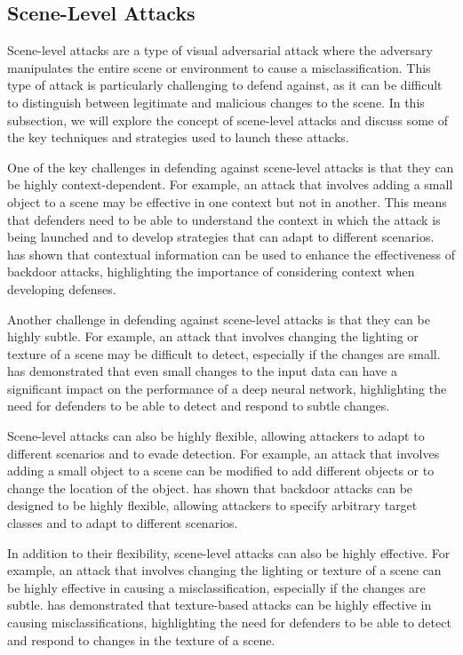 \documentclass[11pt]{article}
\begin{document}
\subsection{Scene-Level Attacks}

Scene-level attacks are a type of visual adversarial attack where the adversary manipulates the entire scene or environment to cause a misclassification. This type of attack is particularly challenging to defend against, as it can be difficult to distinguish between legitimate and malicious changes to the scene. In this subsection, we will explore the concept of scene-level attacks and discuss some of the key techniques and strategies used to launch these attacks.

One of the key challenges in defending against scene-level attacks is that they can be highly context-dependent. For example, an attack that involves adding a small object to a scene may be effective in one context but not in another. This means that defenders need to be able to understand the context in which the attack is being launched and to develop strategies that can adapt to different scenarios. \cite{ref70} has shown that contextual information can be used to enhance the effectiveness of backdoor attacks, highlighting the importance of considering context when developing defenses.

Another challenge in defending against scene-level attacks is that they can be highly subtle. For example, an attack that involves changing the lighting or texture of a scene may be difficult to detect, especially if the changes are small. \cite{ref78} has demonstrated that even small changes to the input data can have a significant impact on the performance of a deep neural network, highlighting the need for defenders to be able to detect and respond to subtle changes.

Scene-level attacks can also be highly flexible, allowing attackers to adapt to different scenarios and to evade detection. For example, an attack that involves adding a small object to a scene can be modified to add different objects or to change the location of the object. \cite{ref79} has shown that backdoor attacks can be designed to be highly flexible, allowing attackers to specify arbitrary target classes and to adapt to different scenarios.

In addition to their flexibility, scene-level attacks can also be highly effective. For example, an attack that involves changing the lighting or texture of a scene can be highly effective in causing a misclassification, especially if the changes are subtle. \cite{ref80} has demonstrated that texture-based attacks can be highly effective in causing misclassifications, highlighting the need for defenders to be able to detect and respond to changes in the texture of a scene.
\end{document}

